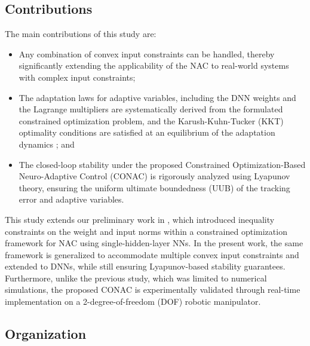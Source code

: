 \documentclass[letterpaper, journal]{IEEEtran}
\begin{document}
\subsection{Contributions}

The main contributions of this study are:
\begin{itemize}

  \item
  Any combination of convex input constraints can be handled, thereby significantly extending the applicability of the NAC to real-world systems with complex input constraints;

  \item 
  The adaptation laws for adaptive variables, including the DNN weights and the Lagrange multipliers are systematically derived from the formulated constrained optimization problem, and the Karush-Kuhn-Tucker (KKT) optimality conditions are satisfied at an equilibrium of the adaptation dynamics \cite[Chap. 12, Thm. 12.1]{Nocedal:2006aa}; and

  \item 
  The closed-loop stability under the proposed Constrained Optimization-Based Neuro-Adaptive Control (CONAC) is rigorously analyzed using Lyapunov theory, ensuring the uniform ultimate boundedness (UUB) of the tracking error and adaptive variables.

\end{itemize}

This study extends our preliminary work in \cite{Ryu:2025ab,Ryu:2025aa}, which introduced inequality constraints on the weight and input norms within a constrained optimization framework for NAC using single-hidden-layer NNs. 
In the present work, the same framework is generalized to accommodate multiple convex input constraints and extended to DNNs, while still ensuring Lyapunov-based stability guarantees.
Furthermore, unlike the previous study, which was limited to numerical simulations, the proposed CONAC is experimentally validated through real-time implementation on a 2-degree-of-freedom (DOF) robotic manipulator.

\subsection{Organization}
\end{document}
